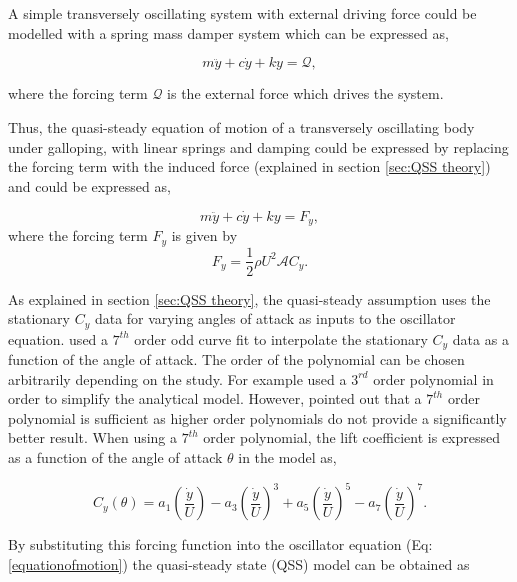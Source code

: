 A simple transversely oscillating system with external driving force could be modelled with a spring mass damper system which can be expressed as,   

\begin{equation}
\label{equationofmotion_1}
m\ddot{y}+c\dot{y}+ky=\mathcal{Q},
\end{equation}

where the forcing term $\mathcal{Q}$ is the external force which drives the system.

Thus, the quasi-steady equation of motion of a transversely oscillating body under galloping, with linear springs and damping could be expressed by replacing the forcing term with the induced force (explained in section \ref{sec:QSS theory}) and could be expressed as,  

\begin{equation}
\label{equationofmotion}
m\ddot{y}+c\dot{y}+ky=F_y,
\end{equation}
where the forcing term $F_y$ is given by
\begin{equation}
\label{lift equation}
F_y=\frac{1}{2}\rho U^2\mathcal{A}C_y.
\end{equation}

As explained in section \ref{sec:QSS theory}, the quasi-steady assumption uses the stationary $C_y$ data for varying angles of attack as inputs to the oscillator equation. \citet{Parkinson1964} used a $7^{th}$ order odd curve fit to interpolate the stationary $C_y$ data as a function of the angle of attack. The order of the polynomial can be chosen arbitrarily depending on the study. For example \citet{Barrero-Gil2009,Barrero-Gil2010a} used a $3^{rd}$ order polynomial in order to simplify the analytical model. However, \citet{Ng2005} pointed out that a $7^{th}$ order polynomial is sufficient as higher order polynomials do not provide a significantly better result. When using a $7^{th}$ order polynomial, the lift coefficient is expressed as a function of the angle of attack $\theta$ in the model as, 

\begin{equation}
\label{cy ploynomial}
C_y(\theta)=a_1\left(\frac{\dot{y}}{U}\right)-a_3\left(\frac{\dot{y}}{U}\right)^3+a_5\left(\frac{\dot{y}}{U}\right)^5-a_7\left(\frac{\dot{y}}{U}\right)^7.
\end{equation}

By substituting this forcing function into the oscillator equation (Eq:\ref{equationofmotion}) the quasi-steady state (QSS) model can be obtained as

